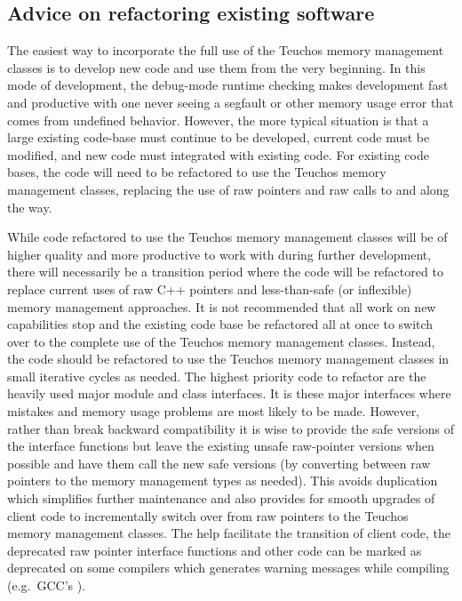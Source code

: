 \documentclass[pdf,ps2pdf,11pt]{SANDreport}
\begin{document}
%
{}\subsection{Advice on refactoring existing software}
%

The easiest way to incorporate the full use of the Teuchos memory
management classes is to develop new code and use them from the very
beginning.  In this mode of development, the debug-mode runtime
checking makes development fast and productive with one never seeing a
segfault or other memory usage error that comes from undefined
behavior.  However, the more typical situation is that a large
existing code-base must continue to be developed, current code must be
modified, and new code must integrated with existing code.  For
existing code bases, the code will need to be refactored to use the
Teuchos memory management classes, replacing the use of raw pointers
and raw calls to {} and {} along the way.

While code refactored to use the Teuchos memory management classes
will be of higher quality and more productive to work with during
further development, there will necessarily be a transition period
where the code will be refactored to replace current uses of raw C++
pointers and less-than-safe (or inflexible) memory management
approaches.  It is not recommended that all work on new capabilities
stop and the existing code base be refactored all at once to switch
over to the complete use of the Teuchos memory management classes.
Instead, the code should be refactored to use the Teuchos memory
management classes in small iterative cycles as needed.  The highest
priority code to refactor are the heavily used major module and class
interfaces.  It is these major interfaces where mistakes and memory
usage problems are most likely to be made.  However, rather than break
backward compatibility it is wise to provide the safe versions of the
interface functions but leave the existing unsafe raw-pointer versions
when possible and have them call the new safe versions (by converting
between raw pointers to the memory management types as needed).  This
avoids duplication which simplifies further maintenance and also
provides for smooth upgrades of client code to incrementally switch
over from raw pointers to the Teuchos memory management classes.  The
help facilitate the transition of client code, the deprecated raw
pointer interface functions and other code can be marked as deprecated
on some compilers which generates warning messages while compiling
(e.g.\ GCC's {}).
\end{document}
